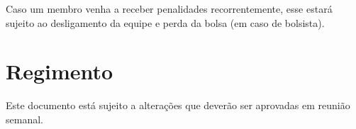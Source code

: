 Caso um membro venha a receber penalidades recorrentemente, esse estará sujeito ao desligamento da equipe e perda da bolsa (em caso de bolsista).


\chapter{Regimento}
\label{chp:regimento}

Este documento está sujeito a alterações que deverão ser aprovadas em reunião semanal.